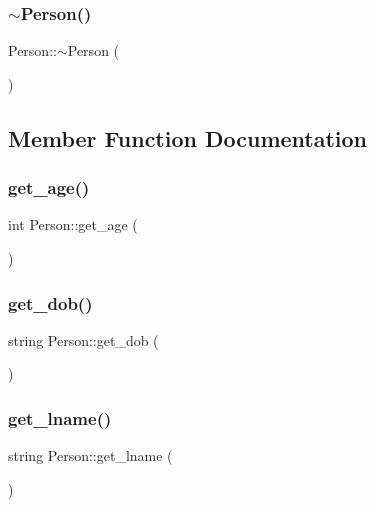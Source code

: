 \mbox{\label{class_person_a700ffd693321c5fe6880262acf43d4da}} 
\subsubsection{\texorpdfstring{$\sim$Person()}{~Person()}}
{\footnotesize\ttfamily Person\+::$\sim$\+Person (\begin{DoxyParamCaption}{ }\end{DoxyParamCaption})}



\subsection{Member Function Documentation}
\mbox{\label{class_person_aca80d4f361d5ea23619ccddfdc393ad4}} 
\subsubsection{\texorpdfstring{get\_age()}{get\_age()}}
{\footnotesize\ttfamily int Person\+::get\+\_\+age (\begin{DoxyParamCaption}{ }\end{DoxyParamCaption})}

\mbox{\label{class_person_aa0c0ebc67c37d68b05ef16c8e0aa3223}} 
\subsubsection{\texorpdfstring{get\_dob()}{get\_dob()}}
{\footnotesize\ttfamily string Person\+::get\+\_\+dob (\begin{DoxyParamCaption}{ }\end{DoxyParamCaption})}

\mbox{\label{class_person_ae05a6813f3c340299a20b0b15f963212}} 
\subsubsection{\texorpdfstring{get\_lname()}{get\_lname()}}
{\footnotesize\ttfamily string Person\+::get\+\_\+lname (\begin{DoxyParamCaption}{ }\end{DoxyParamCaption})}

